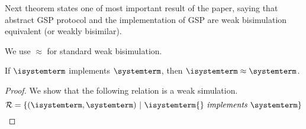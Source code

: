 Next theorem states one of most important result of the paper, saying that abstract GSP protocol and the implementation of GSP are weak bisimulation equivalent (or weakly bisimilar).

We use $\approx$ for standard weak bisimulation.

\begin{theorem} If  $\isystemterm$ implements $\systemterm$, then $\isystemterm\approx\systemterm$. 
\end{theorem}



\begin{proof} We show that the following relation is a weak simulation.
\[
\mathcal{R} = \{ (\isystemterm, \systemterm) \ |\ \implements{\isystemterm{}}{\systemterm} \}
\]





\end{proof}
